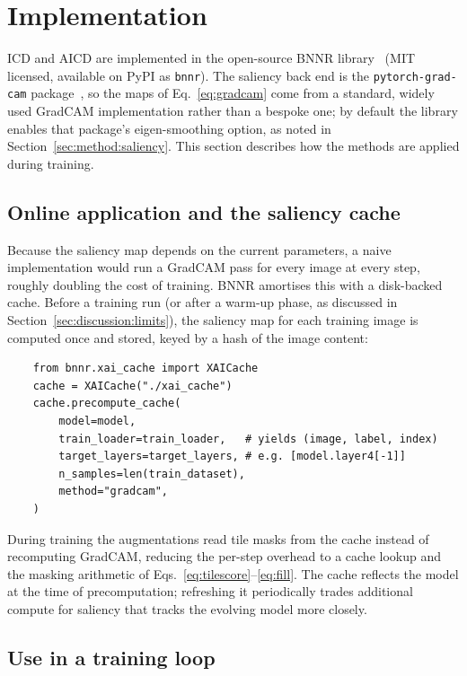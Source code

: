 \section{Implementation}
\label{sec:implementation}

ICD and AICD are implemented in the open-source BNNR
library~\citep{walo2026bnnr} (MIT licensed, available on PyPI as
\texttt{bnnr}).  The saliency back end is the
\texttt{pytorch-grad-cam} package~\citep{gildenblat2021gradcam}, so the maps of
Eq.~\eqref{eq:gradcam} come from a standard, widely used GradCAM implementation
rather than a bespoke one; by default the library enables that package's
eigen-smoothing option, as noted in Section~\ref{sec:method:saliency}.  This
section describes how the methods are applied during training.

\subsection{Online application and the saliency cache}
\label{sec:implementation:cache}

Because the saliency map depends on the current parameters, a naive
implementation would run a GradCAM pass for every image at every step, roughly
doubling the cost of training.  BNNR amortises this with a disk-backed cache.
Before a training run (or after a warm-up phase, as discussed in
Section~\ref{sec:discussion:limits}), the saliency map for each training image
is computed once and stored, keyed by a hash of the image content:
\begin{verbatim}
    from bnnr.xai_cache import XAICache
    cache = XAICache("./xai_cache")
    cache.precompute_cache(
        model=model,
        train_loader=train_loader,   # yields (image, label, index)
        target_layers=target_layers, # e.g. [model.layer4[-1]]
        n_samples=len(train_dataset),
        method="gradcam",
    )
\end{verbatim}
During training the augmentations read tile masks from the cache instead of
recomputing GradCAM, reducing the per-step overhead to a cache lookup and the
masking arithmetic of Eqs.~\eqref{eq:tilescore}--\eqref{eq:fill}.  The cache
reflects the model at the time of precomputation; refreshing it periodically
trades additional compute for saliency that tracks the evolving model more
closely.

\subsection{Use in a training loop}
\label{sec:implementation:loop}

